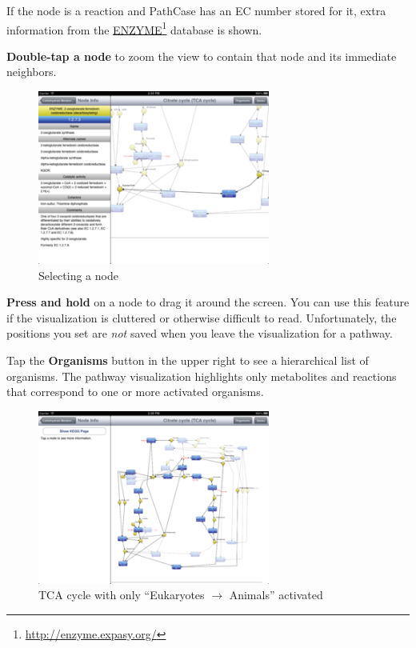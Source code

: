 If the node is a reaction and PathCase has an EC number stored for it, extra
information from the \href{http://enzyme.expasy.org/}{ENZYME}\footnote{\href{http://enzyme.expasy.org/}{http:/\slash enzyme.expasy.org\slash }} database is shown.

\textbf{Double-tap a node} to zoom the view to contain that node and its immediate
neighbors.

\begin{figure}[ht!]
\centering
\includegraphics[width=3in]{kegg_manual/selection_info.png}
\caption{Selecting a node}
\label{}
\end{figure}



\textbf{Press and hold} on a node to drag it around the screen. You can use this
feature if the visualization is cluttered or otherwise difficult to read.
Unfortunately, the positions you set are \emph{not} saved when you leave the
visualization for a pathway.

Tap the \textbf{Organisms} button in the upper right to see a hierarchical list of
organisms. The pathway visualization highlights only metabolites and reactions
that correspond to one or more activated organisms.

\begin{figure}[ht!]
\centering
\includegraphics[width=3in]{kegg_manual/animals_only_graph.png}
\caption{TCA cycle with only ``Eukaryotes $\rightarrow$ Animals''
activated}
\label{}
\end{figure}

